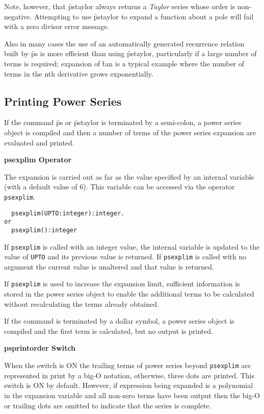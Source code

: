 Note, however, that \f{pstaylor} always returns a \emph{Taylor} series whose
order is non-negative.  Attempting to use \f{pstaylor} to expand a function
about a pole will fail with a zero divisor error message.

Also in many cases the use of an automatically generated recurrence relation
built by \f{ps} is more  efficient than using \f{pstaylor}, particularly if a
large number of terms is required; expansion of \f{tan} is a typical example
where the number of terms in the nth derivative grows exponentially.


\subsection{Printing Power Series}

If the command \f{ps} or \f{pstaylor} is terminated by a semi-colon, a power
series object is compiled and then a number of terms of the
power series expansion are evaluated and printed.

\textbf{psexplim Operator}

The expansion is carried out as far as the value specified by an internal
variable (with a default value of 6). This variable can be accessed via the
operator \texttt{psexplim}.
\hypertarget{operator:PSEXPLIM}{}
\begin{verbatim}
  psexplim(UPTO:integer):integer.
or
  psexplim():integer
\end{verbatim}
If \texttt{psexplim} is called with an integer value, the internal variable is
updated to the value of \texttt{UPTO} and its previous value is returned.
If \texttt{psexplim} is called with no argument the current value is unaltered
and that value is returned. 

If \texttt{psexplim} is used to increase the expansion limit, sufficient
information is stored in the power series object to enable the additional
terms to be calculated without recalculating the terms already obtained.

If the command is terminated by a dollar symbol, a power series object
is compiled and the first term is calculated, but no output is printed.

\textbf{psprintorder Switch}
\hypertarget{switch:PSPRINTORDER}{}

When the switch  is ON the trailing terms of power series
beyond \texttt{psexplim} are represented in print by a big-O notation,
otherwise, three dots are printed. This switch is ON by default.
However, if expression being expanded is a polynomial in the expansion
variable and all non-zero terms have been output then the big-O or trailing
dots are omitted to indicate that the series is complete.

